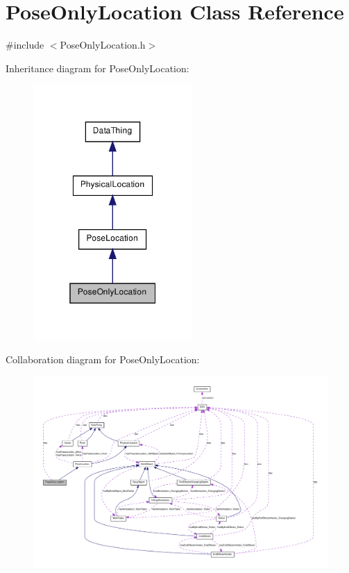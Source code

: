 \hypertarget{class_pose_only_location}{
\section{PoseOnlyLocation Class Reference}
\label{class_pose_only_location}
}


{\ttfamily \#include $<$PoseOnlyLocation.h$>$}



Inheritance diagram for PoseOnlyLocation:\nopagebreak
\begin{figure}[H]
\begin{center}
\leavevmode
\includegraphics[width=172pt]{class_pose_only_location__inherit__graph}
\end{center}
\end{figure}


Collaboration diagram for PoseOnlyLocation:\nopagebreak
\begin{figure}[H]
\begin{center}
\leavevmode
\includegraphics[width=400pt]{class_pose_only_location__coll__graph}
\end{center}
\end{figure}
